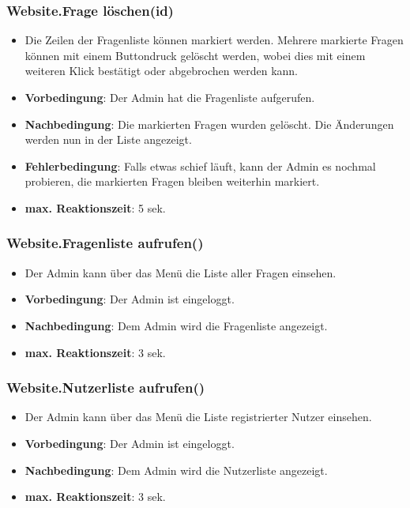 \documentclass[fontsize=12pt,paper=a4,twoside]{scrartcl}
\begin{document}
\subsubsection{Website.Frage löschen(id)}
\begin{itemize}
\item Die Zeilen der Fragenliste können markiert werden. Mehrere markierte Fragen können mit einem Buttondruck gelöscht werden, wobei dies mit einem weiteren Klick bestätigt oder abgebrochen werden kann.
\item \textbf{Vorbedingung}: Der Admin hat die Fragenliste aufgerufen.
\item \textbf{Nachbedingung}: Die markierten Fragen wurden gelöscht. Die Änderungen werden nun in der Liste angezeigt.
\item \textbf{Fehlerbedingung}: Falls etwas schief läuft, kann der Admin es nochmal probieren, die markierten Fragen bleiben weiterhin markiert.
\item \textbf{max. Reaktionszeit}: 5 sek.
\end{itemize}

\subsubsection{Website.Fragenliste aufrufen()}
\begin{itemize}
\item Der Admin kann über das Menü die Liste aller Fragen einsehen.
\item \textbf{Vorbedingung}: Der Admin ist eingeloggt.
\item \textbf{Nachbedingung}: Dem Admin wird die Fragenliste angezeigt. 
\item \textbf{max. Reaktionszeit}: 3 sek.
\end{itemize}

\subsubsection{Website.Nutzerliste aufrufen()}
\begin{itemize}
\item Der Admin kann über das Menü die Liste registrierter Nutzer einsehen.
\item \textbf{Vorbedingung}: Der Admin ist eingeloggt.
\item \textbf{Nachbedingung}: Dem Admin wird die Nutzerliste angezeigt. 
\item \textbf{max. Reaktionszeit}: 3 sek.
\end{itemize}
\end{document}
